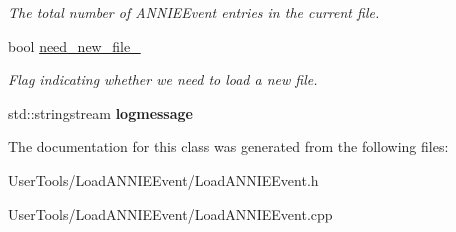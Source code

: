 \begin{DoxyCompactItemize}
\begin{DoxyCompactList}\small\item\em The total number of A\-N\-N\-I\-E\-Event entries in the current file. \end{DoxyCompactList}\item 
\hypertarget{classLoadANNIEEvent_a276ac0416e1310830598036af7e2c0e3}{bool \hyperlink{classLoadANNIEEvent_a276ac0416e1310830598036af7e2c0e3}{need\-\_\-new\-\_\-file\-\_\-}}\label{classLoadANNIEEvent_a276ac0416e1310830598036af7e2c0e3}

\begin{DoxyCompactList}\small\item\em Flag indicating whether we need to load a new file. \end{DoxyCompactList}\item 
\hypertarget{classLoadANNIEEvent_a04316d23550d9c2f36f35f55ec054d20}{std\-::stringstream {\bfseries logmessage}}\label{classLoadANNIEEvent_a04316d23550d9c2f36f35f55ec054d20}

\end{DoxyCompactItemize}


The documentation for this class was generated from the following files\-:\begin{DoxyCompactItemize}
\item 
User\-Tools/\-Load\-A\-N\-N\-I\-E\-Event/Load\-A\-N\-N\-I\-E\-Event.\-h\item 
User\-Tools/\-Load\-A\-N\-N\-I\-E\-Event/Load\-A\-N\-N\-I\-E\-Event.\-cpp\end{DoxyCompactItemize}
